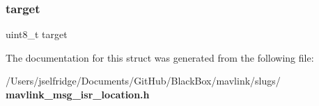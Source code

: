 \subsubsection{target}
{\footnotesize\ttfamily uint8\+\_\+t target}



The documentation for this struct was generated from the following file\+:\begin{DoxyCompactItemize}
\item 
/\+Users/jselfridge/\+Documents/\+Git\+Hub/\+Black\+Box/mavlink/slugs/\textbf{ mavlink\+\_\+msg\+\_\+isr\+\_\+location.\+h}\end{DoxyCompactItemize}
